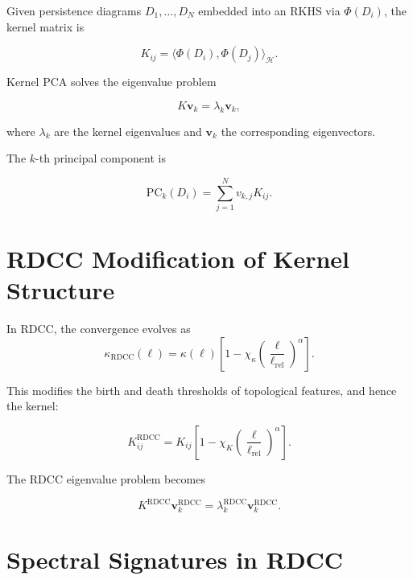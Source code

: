 \documentclass[11pt,a4paper]{article}
\begin{document}
Given persistence diagrams $D_{1}, \dots, D_{N}$ embedded into an RKHS via 
$\Phi(D_{i})$, the kernel matrix is

\begin{equation}
    K_{ij}
    = \langle \Phi(D_{i}), \Phi(D_{j}) \rangle_{\mathcal{H}}.
\end{equation}

Kernel PCA solves the eigenvalue problem

\begin{equation}
    K \bm{v}_{k}
    = \lambda_{k} \bm{v}_{k},
\end{equation}

where $\lambda_{k}$ are the kernel eigenvalues and $\bm{v}_{k}$ the corresponding 
eigenvectors.

The $k$-th principal component is

\begin{equation}
    \mathrm{PC}_{k}(D_{i})
    = \sum_{j=1}^{N} v_{k,j} K_{ij}.
\end{equation}
\section{RDCC Modification of Kernel Structure}

In RDCC, the convergence evolves as
\begin{equation}
    \kappa_{\mathrm{RDCC}}(\ell)
    = \kappa(\ell)
      \left[
        1 - \chi_{\kappa}
        \left(\frac{\ell}{\ell_{\mathrm{rel}}}\right)^{\alpha}
      \right].
\end{equation}

This modifies the birth and death thresholds of topological features, and hence the 
kernel:

\begin{equation}
    K^{\mathrm{RDCC}}_{ij}
    = K_{ij}
      \left[
        1 - \chi_{K}
        \left(\frac{\ell}{\ell_{\mathrm{rel}}}\right)^{\alpha}
      \right].
\end{equation}

The RDCC eigenvalue problem becomes

\begin{equation}
    K^{\mathrm{RDCC}} \bm{v}^{\mathrm{RDCC}}_{k}
    = \lambda^{\mathrm{RDCC}}_{k} \bm{v}^{\mathrm{RDCC}}_{k}.
\end{equation}
\section{Spectral Signatures in RDCC}
\end{document}

